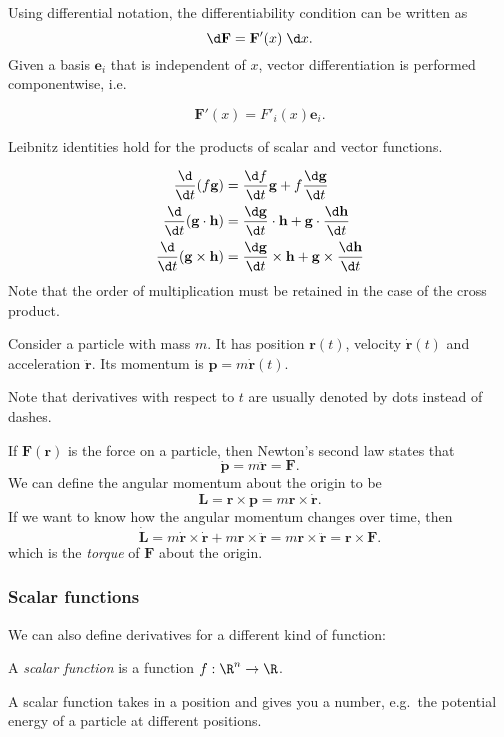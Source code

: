 \documentclass[a4paper]{article}
\begin{document}
Using differential notation, the differentiability condition can be written as
\[
  \d\mathbf{F} = \mathbf{F}'(x)\;\d x.
\]
Given a basis $\mathbf{e}_i$ that is independent of $x$, vector differentiation is performed componentwise, i.e.
\begin{prop}
  \[
    \mathbf{F}'(x) = F'_i(x)\mathbf{e}_i.
  \]
\end{prop}
Leibnitz identities hold for the products of scalar and vector functions.
\begin{prop}
  \begin{align*}
    \frac{\d}{\d t}(f\mathbf{g}) &= \frac{\d f}{\d t}\mathbf{g} + f\frac{\d \mathbf{g}}{\d t}\\
    \frac{\d}{\d t}(\mathbf{g}\cdot \mathbf{h}) &= \frac{\d \mathbf{g}}{\d t}\cdot \mathbf{h} + \mathbf{g}\cdot \frac{\d \mathbf{h}}{\d t}\\
    \frac{\d}{\d t}(\mathbf{g}\times \mathbf{h}) &= \frac{\d \mathbf{g}}{\d t}\times \mathbf{h} + \mathbf{g}\times \frac{\d \mathbf{h}}{\d t}
  \end{align*}
  Note that the order of multiplication must be retained in the case of the cross product.
\end{prop}

\begin{eg}
  Consider a particle with mass $m$. It has position $\mathbf{r}(t)$, velocity $\dot{\mathbf{r}}(t)$ and acceleration $\ddot{\mathbf{r}}$. Its momentum is $\mathbf{p} = m\dot{\mathbf{r}}(t)$.

  Note that derivatives with respect to $t$ are usually denoted by dots instead of dashes.

  If $\mathbf{F}(\mathbf{r})$ is the force on a particle, then Newton's second law states that
  \[
    \dot{\mathbf{p}} = m\ddot{\mathbf{r}} = \mathbf{F}.
  \]
  We can define the angular momentum about the origin to be
  \[
    \mathbf{L} = \mathbf{r}\times \mathbf{p} = m\mathbf{r} \times \dot{\mathbf{r}}.
  \]
  If we want to know how the angular momentum changes over time, then
  \[
    \dot{\mathbf{L}} = m\dot{\mathbf{r}}\times \dot{\mathbf{r}} + m\mathbf{r}\times \ddot{\mathbf{r}} = m\mathbf{r}\times \ddot{\mathbf{r}} = \mathbf{r}\times \mathbf{F}.
  \]
  which is the \emph{torque} of $\mathbf{F}$ about the origin.
\end{eg}

\subsubsection*{Scalar functions }
We can also define derivatives for a different kind of function:
\begin{defi}
  A \emph{scalar function} is a function $f: \R^n \to \R$.
\end{defi}
A scalar function takes in a position and gives you a number, e.g.\ the potential energy of a particle at different positions.
\end{document}
